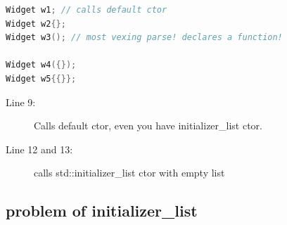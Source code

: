 \documentclass[a4paper,11pt,twoside]{book}
\begin{document}
\begin{itemize}
\begin{lstlisting}[frame=single, language=c++,mathescape=true]
Widget w1; // calls default ctor
Widget w2{}; 
Widget w3(); // most vexing parse! declares a function!
	
Widget w4({}); 
Widget w5{{}}; 
\end{lstlisting}
\begin{description}
	\item[Line 9:] Calls default ctor, even  you have  initializer\_list ctor.
	\item[Line 12 and 13:] calls std::initializer\_list ctor with empty list
\end{description}
	
	\end{itemize}
	
\subsection{problem of initializer\_list}
	
\end{document}
